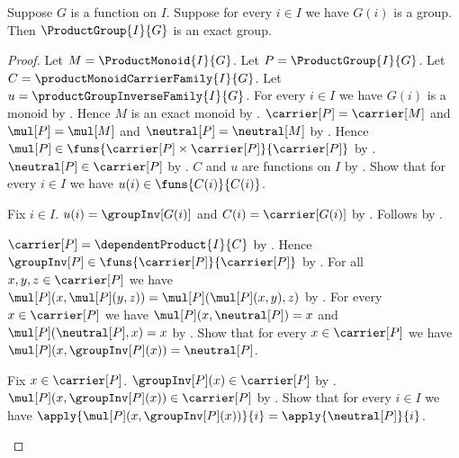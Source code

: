 \begin{theorem}\label{product_group_is_exact}
    Suppose $G$ is a function on $I$.
    Suppose for every $i\in I$ we have $G(i)$ is a group.
    Then $\ProductGroup{I}{G}$ is an exact group.
\end{theorem}
\begin{proof}
    Let $M=\ProductMonoid{I}{G}$.
    Let $P=\ProductGroup{I}{G}$.
    Let $C=\productMonoidCarrierFamily{I}{G}$.
    Let $u=\productGroupInverseFamily{I}{G}$.
    For every $i\in I$ we have $G(i)$ is a monoid by
        .
    Hence $M$ is an exact monoid by .
    $\carrier[P]=\carrier[M]$ and $\mul[P]=\mul[M]$ and
        $\neutral[P]=\neutral[M]$ by .
    Hence $\mul[P]\in\funs{\carrier[P]\times\carrier[P]}{
        \carrier[P]}$ by .
    $\neutral[P]\in\carrier[P]$ by
        .
    $C$ and $u$ are functions on $I$ by
        .
    Show that for every $i\in I$ we have
        $u(i)\in\funs{C(i)}{C(i)}$.
    \begin{subproof}
        Fix $i\in I$.
        $u(i)=\groupInv[G(i)]$ and $C(i)=\carrier[G(i)]$ by
            .
        Follows by .
    \end{subproof}
    $\carrier[P]=\dependentProduct{I}{C}$ by
        .
    Hence $\groupInv[P]\in\funs{\carrier[P]}{\carrier[P]}$ by
        .
    For all $x,y,z\in\carrier[P]$ we have
        $\mul[P](x,\mul[P](y,z))=\mul[P](\mul[P](x,y),z)$ by
        .
    For every $x\in\carrier[P]$ we have
        $\mul[P](x,\neutral[P])=x$ and
        $\mul[P](\neutral[P],x)=x$ by
        .
    Show that for every $x\in\carrier[P]$ we have
        $\mul[P](x,\groupInv[P](x))=\neutral[P]$.
    \begin{subproof}
        Fix $x\in\carrier[P]$.
        $\groupInv[P](x)\in\carrier[P]$ by .
        $\mul[P](x,\groupInv[P](x))\in\carrier[P]$ by
            .
        Show that for every $i\in I$ we have
            $\apply{\mul[P](x,\groupInv[P](x))}{i}
                =\apply{\neutral[P]}{i}$.

\end{subproof}
\end{proof}
